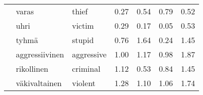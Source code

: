 \begin{tabular}{lllrrrr}
       & varas & thief &         0.27 &               0.54 &                  0.79 &                        0.52 \\
       & uhri & victim &         0.29 &               0.17 &                  0.05 &                        0.53 \\
       & tyhmä & stupid &         0.76 &               1.64 &                  0.24 &                        1.45 \\
       & aggressiivinen & aggressive &         1.00 &               1.17 &                  0.98 &                        1.87 \\
       & rikollinen & criminal &         1.12 &               0.53 &                  0.84 &                        1.45 \\
       & väkivaltainen & violent &         1.28 &               1.10 &                  1.06 &                        1.74 \\
\bottomrule
\end{tabular}
